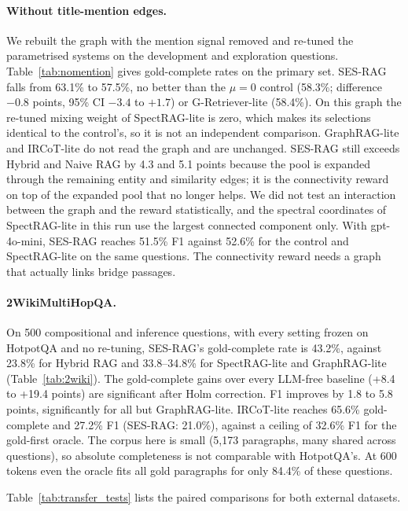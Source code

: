 \paragraph{Without title-mention edges.}
We rebuilt the graph with the mention signal removed and re-tuned the parametrised systems on the development and exploration questions. Table~\ref{tab:nomention} gives gold-complete rates on the primary set. SES-RAG falls from 63.1\% to 57.5\%, no better than the $\mu{=}0$ control (58.3\%; difference $-0.8$ points, 95\% CI $-3.4$ to $+1.7$) or G-Retriever-lite (58.4\%). On this graph the re-tuned mixing weight of SpectRAG-lite is zero, which makes its selections identical to the control's, so it is not an independent comparison. GraphRAG-lite and IRCoT-lite do not read the graph and are unchanged. SES-RAG still exceeds Hybrid and Naive RAG by 4.3 and 5.1 points because the pool is expanded through the remaining entity and similarity edges; it is the connectivity reward on top of the expanded pool that no longer helps. We did not test an interaction between the graph and the reward statistically, and the spectral coordinates of SpectRAG-lite in this run use the largest connected component only. With gpt-4o-mini, SES-RAG reaches 51.5\% F1 against 52.6\% for the control and SpectRAG-lite on the same questions. The connectivity reward needs a graph that actually links bridge passages.



\paragraph{2WikiMultiHopQA.}
On 500 compositional and inference questions, with every setting frozen on HotpotQA and no re-tuning, SES-RAG's gold-complete rate is 43.2\%, against 23.8\% for Hybrid RAG and 33.8--34.8\% for SpectRAG-lite and GraphRAG-lite (Table~\ref{tab:2wiki}). The gold-complete gains over every LLM-free baseline (+8.4 to +19.4 points) are significant after Holm correction. F1 improves by 1.8 to 5.8 points, significantly for all but GraphRAG-lite. IRCoT-lite reaches 65.6\% gold-complete and 27.2\% F1 (SES-RAG: 21.0\%), against a ceiling of 32.6\% F1 for the gold-first oracle. The corpus here is small (5{,}173 paragraphs, many shared across questions), so absolute completeness is not comparable with HotpotQA's. At 600 tokens even the oracle fits all gold paragraphs for only 84.4\% of these questions.



Table~\ref{tab:transfer_tests} lists the paired comparisons for both external datasets.

